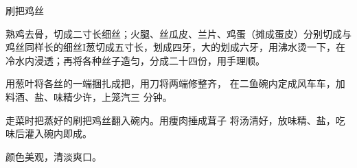 \begin{recipe}{刷把鸡丝}

\ingredients




\cooking

\step 熟鸡去骨，切成二寸长细丝；火腿、丝瓜皮、兰片、鸡蛋（摊成蛋皮）分别切成与鸡丝同样长的细丝I葱切成五寸长，划成四牙，大的划成六牙，用沸水烫一下，在冷水内浸透；再将各种丝子造匀，分成二十四份，用手理顺。

用葱叶将各丝的一端捆扎成把，用刀将两端修整齐， 在二鱼碗内定成风车车，加料酒、盐、味精少许，上笼汽三 分钟。

走菜时把蒸好的刷把鸡丝翻入碗内。用痩肉捶成茸子 将汤清好，放味精、盐，吃味后灌入碗内即成。

\notes

颜色美观，清淡爽口。

\end{recipe}


